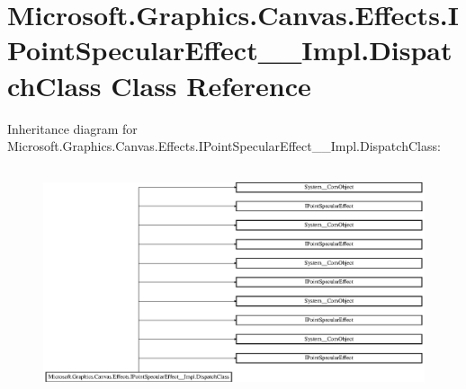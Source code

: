 \hypertarget{class_microsoft_1_1_graphics_1_1_canvas_1_1_effects_1_1_i_point_specular_effect_____impl_1_1_dispatch_class}{}\section{Microsoft.\+Graphics.\+Canvas.\+Effects.\+I\+Point\+Specular\+Effect\+\_\+\+\_\+\+Impl.\+Dispatch\+Class Class Reference}
\label{class_microsoft_1_1_graphics_1_1_canvas_1_1_effects_1_1_i_point_specular_effect_____impl_1_1_dispatch_class}
Inheritance diagram for Microsoft.\+Graphics.\+Canvas.\+Effects.\+I\+Point\+Specular\+Effect\+\_\+\+\_\+\+Impl.\+Dispatch\+Class\+:\begin{figure}[H]
\begin{center}
\leavevmode
\includegraphics[height=6.739606cm]{class_microsoft_1_1_graphics_1_1_canvas_1_1_effects_1_1_i_point_specular_effect_____impl_1_1_dispatch_class}
\end{center}
\end{figure}
